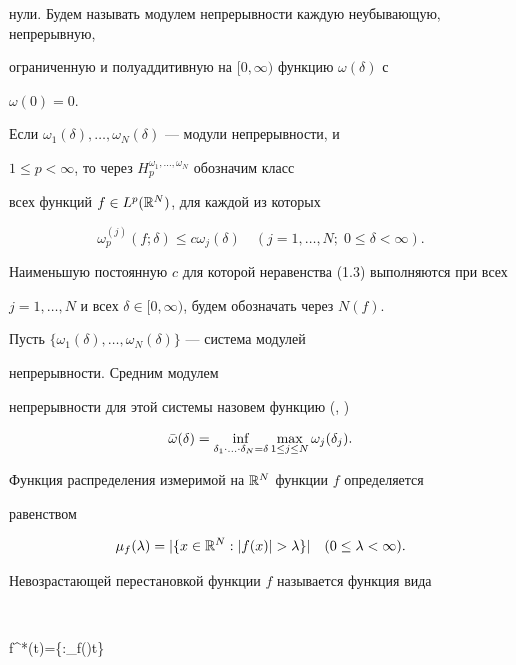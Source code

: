 нули. Будем называть модулем непрерывности каждую неубывающую, непрерывную, 


ограниченную и полуаддитивную на $[0,\infty)$ функцию $\omega(\delta)$ с 


$\omega(0)=0$. 


 


Если $\omega_1(\delta),\dotsc,\omega_N(\delta)$ --- модули непрерывности, и 


$1\le p<\infty$, то через $H_p^{\omega_1,\dotsc,\omega_N}$ обозначим класс 


всех функций $f\in L^p(\Bbb R^N)$, для каждой из которых 


\begin{equation} 


\omega_p^{(j)}(f;\delta) \le c\omega_j(\delta) 


\quad (j=1,\dotsc,N; \; 0\le\delta<\infty). 


\end{equation} 


Наименьшую постоянную $c$ для которой неравенства (1.3) выполняются при всех 


$j=1,\dotsc,N$ и всех $\delta\in[0,\infty)$, будем обозначать через $N(f)$. 


 


Пусть $\{\omega_1(\delta),\dotsc,\omega_N(\delta)\}$ --- система модулей 


непрерывности. Средним модулем 


непрерывности для этой системы назовем функцию (\cite{Kol2}, \cite{Kol3}) 


$$ 


\Bar\omega(\delta)=\inf_{\delta_1\cdot\dotsc\cdot\delta_N=\delta} 


\max_{1\le j\le N}\omega_j(\delta_j). 


$$ 


Функция распределения измеримой на $\Bbb R^N$ функции $f$ определяется 


равенством 


$$ 


\mu_f(\lambda)=|\{x\in\Bbb R^N:|f(x)|>\lambda\}| \quad 


(0\le \lambda<\infty). 


$$ 


Невозрастающей перестановкой функции $f$ называется функция вида 


$$ 


f^*(t)=\inf\{\lambda:\mu_f(\lambda)\le t\} \quad 


